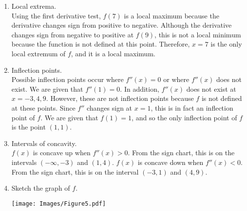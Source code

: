 \documentclass[nooutcomes]{ximera}
\renewenvironment{freeResponse}{
\ifhandout\setbox0\vbox\bgroup\else
\begin{trivlist}\item[\hskip \labelsep\bfseries Solution:\hspace{2ex}]
\fi}
{\ifhandout\egroup\else
\end{trivlist}
\fi}
\begin{document}
\begin{problem}
\begin{freeResponse}
\begin{enumerate}
      \item
        Local extrema.  \\
        Using the first derivative test, $f(7)$ is a local maximum because the derivative changes sign from positive to negative.
        Although the derivative changes sign from negative to positive at $f(9)$, this is not a local minimum because the function is not defined at this point.
        Therefore, $x=7$ is the only local extremum of $f$, and it is a local maximum.
			
      \item
        Inflection points.  \\
        Possible inflection points occur where $f''(x)=0$ or where $f''(x)$ does not exist.
        We are given that $f''(1)=0$.
        In addition, $f''(x)$ does not exist at $x=-3,4,9$.
        However, these are not inflection points because $f$ is not defined at these points.
        Since $f''$ changes sign at $x=1$, this is in fact an inflection point of $f$.
        We are given that $f(1) = 1$, and so the only inflection point of $f$ is the point $(1,1)$.  
			
      \item
        Intervals of concavity.  \\
        $f(x)$ is concave up when $f''(x)>0$.
        From the sign chart, this is on the intervals $(-\infty ,-3)$ and $(1,4)$.
        $f(x)$ is concave down when $f''(x)<0$.
        From the sign chart, this is on the interval $(-3,1)$ and $(4,9)$.
        
			
      \item
        Sketch the graph of $f$.
        \begin{image}
          \texttt{[image: Images/Figure5.pdf]}
	\end{image}
    \end{enumerate}
  \end{freeResponse}
\end{problem}
\end{document}
